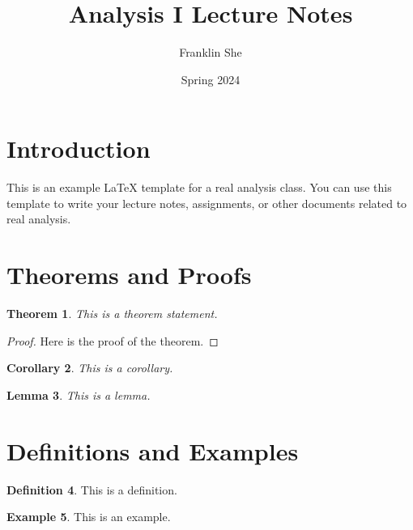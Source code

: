 \documentclass[12pt]{article}
\title{Analysis I Lecture Notes}
\author{Franklin She}
\date{Spring 2024}
\newtheorem{theorem}{Theorem}[section]
\newtheorem{corollary}[theorem]{Corollary}
\newtheorem{lemma}[theorem]{Lemma}
\theoremstyle{definition}
\newtheorem{definition}[theorem]{Definition}
\newtheorem{example}[theorem]{Example}
\theoremstyle{remark}
\begin{document}
\maketitle

\section{Introduction}

This is an example LaTeX template for a real analysis class. You can use this template to write your lecture notes, assignments, or other documents related to real analysis.

\section{Theorems and Proofs}

\begin{theorem}
    This is a theorem statement.
\end{theorem}

\begin{proof}
    Here is the proof of the theorem.
\end{proof}

\begin{corollary}
    This is a corollary.
\end{corollary}

\begin{lemma}
    This is a lemma.
\end{lemma}

\section{Definitions and Examples}

\begin{definition}
    This is a definition.
\end{definition}

\begin{example}
    This is an example.
\end{example}
\end{document}
